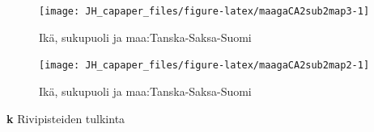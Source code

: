 \documentclass[
  finnish,
]{book}
\begin{document}
\begin{figure}

{\centering \texttt{[image: JH\_capaper\_files/figure-latex/maagaCA2sub2map3-1]} 

}

\caption{Ikä, sukupuoli ja maa:Tanska-Saksa-Suomi}\label{fig:maagaCA2sub2map3}
\end{figure}

\begin{figure}

{\centering \texttt{[image: JH\_capaper\_files/figure-latex/maagaCA2sub2map2-1]} 

}

\caption{Ikä, sukupuoli ja maa:Tanska-Saksa-Suomi}\label{fig:maagaCA2sub2map2}
\end{figure}

\textbf{k} Rivipisteiden tulkinta
\end{document}
